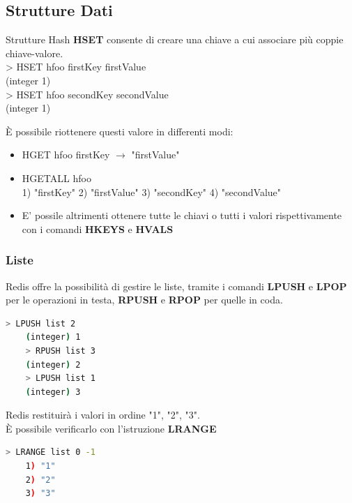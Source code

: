 \documentclass[xcolor=dvipsnames]{beamer}
\begin{document}
      \subsection{Strutture Dati}
        \begin{frame}{Strutture Hash}
          \textbf{HSET} consente di creare una chiave a cui associare più coppie chiave-valore. \\
          > HSET hfoo firstKey firstValue \\
          (integer 1)\\
          > HSET hfoo secondKey secondValue\\
          (integer 1)

          \bigskip

          È possibile riottenere questi valore in differenti modi:
          \begin{itemize}
            \item HGET hfoo firstKey $\rightarrow$ "firstValue"
            \item HGETALL hfoo \\
                  1) "firstKey"
                  2) "firstValue"
                  3) "secondKey"
                  4) "secondValue"
            \item E' possile altrimenti ottenere tutte le chiavi o tutti i valori rispettivamente con i comandi \textbf{HKEYS} e  \textbf{HVALS}
          \end{itemize}

        \end{frame}

\begin{frame}[fragile]
  \frametitle{Liste}
  Redis offre la possibilità di gestire le liste, tramite i comandi \textbf{LPUSH} e \textbf{LPOP} per le operazioni in testa,
  \textbf{RPUSH} e \textbf{RPOP} per quelle in coda.
  \\
  \begin{lstlisting}[language=bash]
    > LPUSH list 2
    (integer) 1
    > RPUSH list 3
    (integer) 2
    > LPUSH list 1
    (integer) 3
  \end{lstlisting}

  Redis restituirà i valori in ordine "1", "2", "3". \\
  È possibile verificarlo con l'istruzione \textbf{LRANGE}
  \\

  \begin{lstlisting}[language=bash]
    > LRANGE list 0 -1
    1) "1"
    2) "2"
    3) "3"
  \end{lstlisting}

\end{frame}
\end{document}
